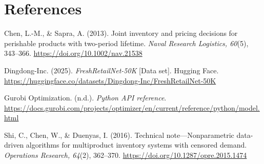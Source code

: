 \documentclass[11pt,letterpaper]{article}
\begin{document}
\section*{References}
Chen, L.-M., \& Sapra, A. (2013). Joint inventory and pricing decisions for
perishable products with two-period lifetime. \textit{Naval Research Logistics,
60}(5), 343--366. \url{https://doi.org/10.1002/nav.21538}

Dingdong-Inc. (2025). \textit{FreshRetailNet-50K} [Data set]. Hugging Face.
\url{https://huggingface.co/datasets/Dingdong-Inc/FreshRetailNet-50K}

Gurobi Optimization. (n.d.). \textit{Python API reference}.
\url{https://docs.gurobi.com/projects/optimizer/en/current/reference/python/model.html}

Shi, C., Chen, W., \& Duenyas, I. (2016). Technical note---Nonparametric data-driven
algorithms for multiproduct inventory systems with censored demand.
\textit{Operations Research, 64}(2), 362--370.
\url{https://doi.org/10.1287/opre.2015.1474}
\end{document}
